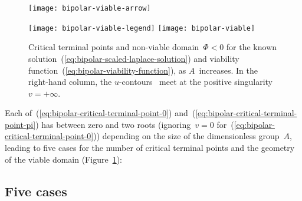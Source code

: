 \begin{figure}
  \centering
  \begin{minipage}[b]{0.1\textwidth}
    \texttt{[image: bipolar-viable-arrow]}
  \end{minipage}
  \begin{minipage}[b]{0.8\textwidth}
    \newcommand*{\legendtrimwidth}{0.03\textwidth}
    \newcommand*{\legendoffsetheight}{0.025\textwidth}
    \texttt{[image: bipolar-viable-legend]}
    \texttt{[image: bipolar-viable]}
  \end{minipage}
  \caption{
    Critical terminal points and non-viable domain~$\Phi < 0$
    for the known solution~(\ref{eq:bipolar-scaled-laplace-solution})
    and viability function~(\ref{eq:bipolar-viability-function}),
    as $A$~increases.
    In the right-hand column,
    the $u$-contours~ meet
    at the positive singularity~$v = +\infty$.
  }
  \label{fig:bipolar-viable}
\end{figure}

Each of~(\ref{eq:bipolar-critical-terminal-point-0})
and~(\ref{eq:bipolar-critical-terminal-point-pi})
has between zero and two roots
(ignoring~$v = 0$ for~(\ref{eq:bipolar-critical-terminal-point-0}))
depending on the size of the dimensionless group~$A$,
leading to five cases for the number of critical terminal points
and the geometry of the viable domain
(Figure~\ref{fig:bipolar-viable}):

\subsection{Five cases}
\label{sec:bipolar.viable.cases}

